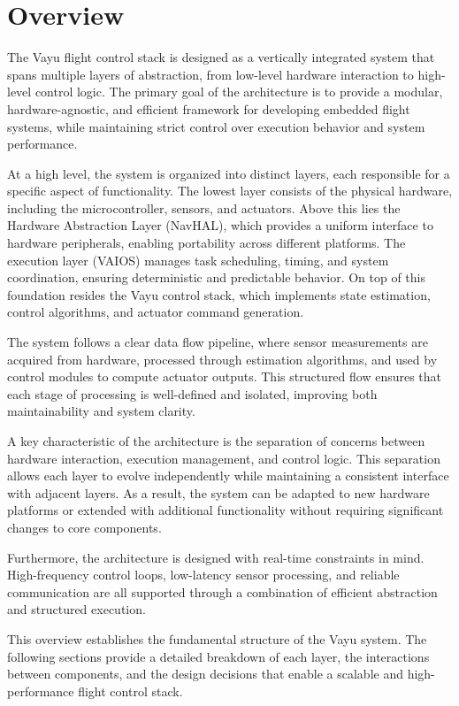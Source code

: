 \section{Overview}
\label{sec:overview}

The Vayu flight control stack is designed as a vertically integrated system that spans multiple layers of abstraction, from low-level hardware interaction to high-level control logic. The primary goal of the architecture is to provide a modular, hardware-agnostic, and efficient framework for developing embedded flight systems, while maintaining strict control over execution behavior and system performance.

At a high level, the system is organized into distinct layers, each responsible for a specific aspect of functionality. The lowest layer consists of the physical hardware, including the microcontroller, sensors, and actuators. Above this lies the Hardware Abstraction Layer (NavHAL), which provides a uniform interface to hardware peripherals, enabling portability across different platforms. The execution layer (VAIOS) manages task scheduling, timing, and system coordination, ensuring deterministic and predictable behavior. On top of this foundation resides the Vayu control stack, which implements state estimation, control algorithms, and actuator command generation.

The system follows a clear data flow pipeline, where sensor measurements are acquired from hardware, processed through estimation algorithms, and used by control modules to compute actuator outputs. This structured flow ensures that each stage of processing is well-defined and isolated, improving both maintainability and system clarity.

A key characteristic of the architecture is the separation of concerns between hardware interaction, execution management, and control logic. This separation allows each layer to evolve independently while maintaining a consistent interface with adjacent layers. As a result, the system can be adapted to new hardware platforms or extended with additional functionality without requiring significant changes to core components.

Furthermore, the architecture is designed with real-time constraints in mind. High-frequency control loops, low-latency sensor processing, and reliable communication are all supported through a combination of efficient abstraction and structured execution.

This overview establishes the fundamental structure of the Vayu system. The following sections provide a detailed breakdown of each layer, the interactions between components, and the design decisions that enable a scalable and high-performance flight control stack.